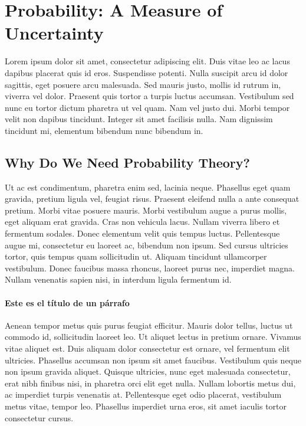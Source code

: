 \documentclass[11pt,letterpaper]{book}
\begin{document}
\section{Probability: A Measure of Uncertainty}
\noindent Lorem ipsum dolor sit amet, consectetur adipiscing elit. Duis vitae leo ac lacus dapibus placerat quis id eros. Suspendisse potenti. Nulla suscipit arcu id dolor sagittis, eget posuere arcu malesuada. Sed mauris justo, mollis id rutrum in, viverra vel dolor. Praesent quis tortor a turpis luctus accumsan. Vestibulum sed nunc eu tortor dictum pharetra ut vel quam. Nam vel justo dui. Morbi tempor velit non dapibus tincidunt. Integer sit amet facilisis nulla. Nam dignissim tincidunt mi, elementum bibendum nunc bibendum in.

\subsection{Why Do We Need Probability Theory?}
\noindent Ut ac est condimentum, pharetra enim sed, lacinia neque. Phasellus eget quam gravida, pretium ligula vel, feugiat risus. Praesent eleifend nulla a ante consequat pretium. Morbi vitae posuere mauris. Morbi vestibulum augue a purus mollis, eget aliquam erat gravida. Cras non vehicula lacus. Nullam viverra libero et fermentum sodales. Donec elementum velit quis tempus luctus. Pellentesque augue mi, consectetur eu laoreet ac, bibendum non ipsum. Sed cursus ultricies tortor, quis tempus quam sollicitudin ut. Aliquam tincidunt ullamcorper vestibulum. Donec faucibus massa rhoncus, laoreet purus nec, imperdiet magna. Nullam venenatis sapien nisi, in interdum ligula fermentum id.

\paragraph{Este es el título de un párrafo} Aenean tempor metus quis purus feugiat efficitur. Mauris dolor tellus, luctus ut commodo id, sollicitudin laoreet leo. Ut aliquet lectus in pretium ornare. Vivamus vitae aliquet est. Duis aliquam dolor consectetur est ornare, vel fermentum elit ultricies. Phasellus accumsan non ipsum sit amet faucibus. Vestibulum quis neque non ipsum gravida aliquet. Quisque ultricies, nunc eget malesuada consectetur, erat nibh finibus nisi, in pharetra orci elit eget nulla. Nullam lobortis metus dui, ac imperdiet turpis venenatis at. Pellentesque eget odio placerat, vestibulum metus vitae, tempor leo. Phasellus imperdiet urna eros, sit amet iaculis tortor consectetur cursus. 
\end{document}
